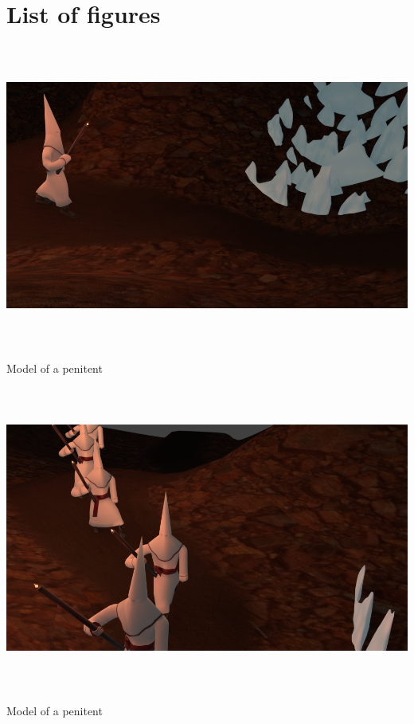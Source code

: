 \documentclass[12pt,a4paper,titlepage,final,tikz,border=4mm]{report}
\begin{document}
\section{List of  figures}
\begin {center}
\includegraphics [height = 10cm] {FirstPenitente.png}
\caption {Model of a penitent}
\end {center}
\begin {center}
\includegraphics [height = 10cm] {procession.png}
\caption {Model of a penitent}
\end {center}
\end{document}
